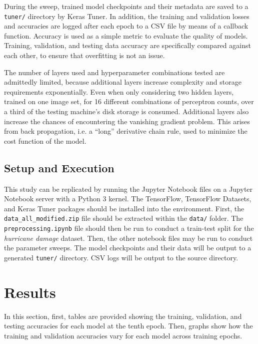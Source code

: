 \documentclass{article}
\begin{document}
During the sweep, trained model checkpoints and their metadata are saved to a \verb|tuner/| directory by Keras Tuner. In addition, the training and validation losses and accuracies are logged after each epoch to a CSV file by means of a callback function. Accuracy is used as a simple metric to evaluate the quality of models. Training, validation, and testing data accuracy are specifically compared against each other, to ensure that overfitting is not an issue.

The number of layers used and hyperparameter combinations tested are admittedly limited, because additional layers increase complexity and storage requirements exponentially. Even when only considering two hidden layers, trained on one image set, for 16 different combinations of perceptron counts, over a third of the testing machine's disk storage is consumed. Additional layers also increase the chances of encountering the vanishing gradient problem. This arises from back propagation, i.e. a ``long'' derivative chain rule, used to minimize the cost function of the model.

\subsection{Setup and Execution}

This study can be replicated by running the Jupyter Notebook files on a Jupyter Notebook server with a Python 3 kernel. The TensorFlow, TensorFlow Datasets, and Keras Tuner packages should be installed into the environment. First, the \verb|data_all_modified.zip| file should be extracted within the \verb|data/| folder. The \verb|preprocessing.ipynb| file should then be run to conduct a train-test split for the \emph{hurricane damage} dataset. Then, the other notebook files may be run to conduct the parameter sweeps. The model checkpoints and their data will be output to a generated \verb|tuner/| directory. CSV logs will be output to the source directory.

\section{Results}

\FloatBarrier

In this section, first, tables are provided showing the training, validation, and testing accuracies for each model at the tenth epoch. Then, graphs show how the training and validation accuracies vary for each model across training epochs.
\end{document}

